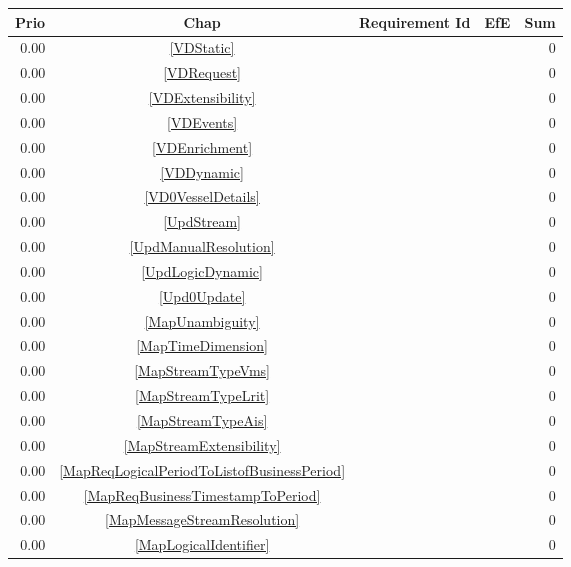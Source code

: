 \begin{longtable}{|r|c|p{7cm}||r|r|} \hline
\textbf{Prio} & \textbf{Chap} & \textbf{Requirement Id} & \textbf{EfE} & \textbf{Sum} \\ \hline\endhead
0.00 & \ref{VDStatic} & \nameref{VDStatic} &   & 0 \\ \hline
0.00 & \ref{VDRequest} & \nameref{VDRequest} &   & 0 \\ \hline
0.00 & \ref{VDExtensibility} & \nameref{VDExtensibility} &   & 0 \\ \hline
0.00 & \ref{VDEvents} & \nameref{VDEvents} &   & 0 \\ \hline
0.00 & \ref{VDEnrichment} & \nameref{VDEnrichment} &   & 0 \\ \hline
0.00 & \ref{VDDynamic} & \nameref{VDDynamic} &   & 0 \\ \hline
0.00 & \ref{VD0VesselDetails} & \nameref{VD0VesselDetails} &   & 0 \\ \hline
0.00 & \ref{UpdStream} & \nameref{UpdStream} &   & 0 \\ \hline
0.00 & \ref{UpdManualResolution} & \nameref{UpdManualResolution} &   & 0 \\ \hline
0.00 & \ref{UpdLogicDynamic} & \nameref{UpdLogicDynamic} &   & 0 \\ \hline
0.00 & \ref{Upd0Update} & \nameref{Upd0Update} &   & 0 \\ \hline
0.00 & \ref{MapUnambiguity} & \nameref{MapUnambiguity} &   & 0 \\ \hline
0.00 & \ref{MapTimeDimension} & \nameref{MapTimeDimension} &   & 0 \\ \hline
0.00 & \ref{MapStreamTypeVms} & \nameref{MapStreamTypeVms} &   & 0 \\ \hline
0.00 & \ref{MapStreamTypeLrit} & \nameref{MapStreamTypeLrit} &   & 0 \\ \hline
0.00 & \ref{MapStreamTypeAis} & \nameref{MapStreamTypeAis} &   & 0 \\ \hline
0.00 & \ref{MapStreamExtensibility} & \nameref{MapStreamExtensibility} &   & 0 \\ \hline
0.00 & \ref{MapReqLogicalPeriodToListofBusinessPeriod} & \nameref{MapReqLogicalPeriodToListofBusinessPeriod} &   & 0 \\ \hline
0.00 & \ref{MapReqBusinessTimestampToPeriod} & \nameref{MapReqBusinessTimestampToPeriod} &   & 0 \\ \hline
0.00 & \ref{MapMessageStreamResolution} & \nameref{MapMessageStreamResolution} &   & 0 \\ \hline
0.00 & \ref{MapLogicalIdentifier} & \nameref{MapLogicalIdentifier} &   & 0 \\ \hline

\end{longtable}
